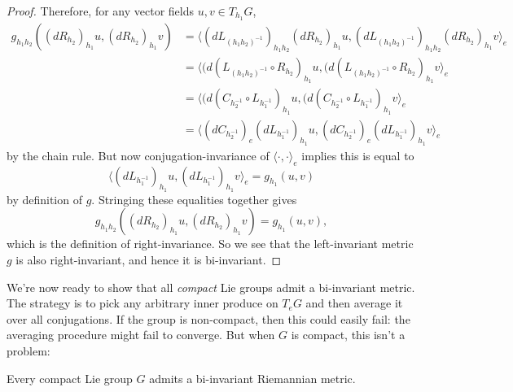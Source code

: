 \begin{proof}
	Therefore, for any vector fields $u,v \in T_{h_1}G$,
	\begin{align*}
		g_{h_1h_2}((dR_{h_2})_{h_1}u, (dR_{h_2})_{h_1}v) & = \langle (dL_{(h_1h_2)^{-1}})_{h_1h_2}(dR_{h_2})_{h_1}u, (dL_{(h_1h_2)^{-1}})_{h_1h_2}(dR_{h_2})_{h_1}v \rangle_e \\
		& = \langle (d(L_{(h_1h_2)^{-1}}\circ R_{h_2})_{h_1}u, (d(L_{(h_1h_2)^{-1}}\circ R_{h_2})_{h_1}v \rangle_e \\
		& = \langle (d(C_{h_2^{-1}} \circ L_{h_1^{-1}})_{h_1}u, (d(C_{h_2^{-1}} \circ L_{h_1^{-1}})_{h_1}v \rangle_e \\
		& = \langle (dC_{h_2^{-1}})_{e} (dL_{h_1^{-1}})_{h_1}u, (dC_{h_2^{-1}})_{e} (dL_{h_1^{-1}})_{h_1}v \rangle_e
	\end{align*}
	by the chain rule. But now conjugation-invariance of $\langle \cdot , \cdot \rangle_e$ implies this is equal to
	\[
		\langle (dL_{h_1^{-1}})_{h_1}u, (dL_{h_1^{-1}})_{h_1}v \rangle_e = g_{h_1}(u,v)
	\]
	by definition of $g$. Stringing these equalities together gives 
	\[
		g_{h_1h_2}((dR_{h_2})_{h_1}u, (dR_{h_2})_{h_1}v) = g_{h_1}(u,v),
	\]
	which is the definition of right-invariance. So we see that the left-invariant metric $g$ is also right-invariant, and hence it is bi-invariant.
\end{proof}

We're now ready to show that all \emph{compact} Lie groups admit a bi-invariant metric. The strategy is to pick any arbitrary inner produce on $T_eG$ and then average it over all conjugations. If the group is non-compact, then this could easily fail: the averaging procedure might fail to converge. But when $G$ is compact, this isn't a problem:

\begin{theorem}\label{thm:bi-invariant metrics}
	Every compact Lie group $G$ admits a bi-invariant Riemannian metric.
\end{theorem}


